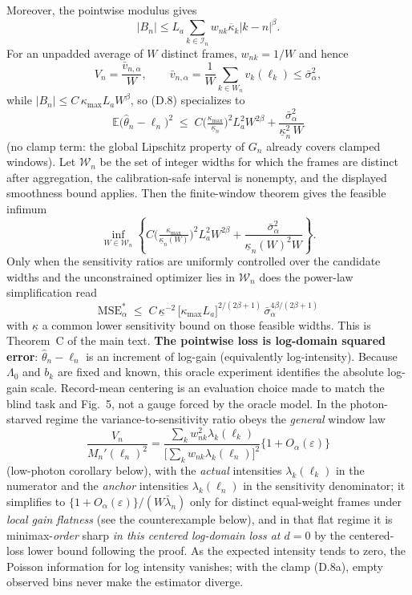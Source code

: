 Moreover, the pointwise modulus gives
\[
|B_n|
\le
L_a\sum_{k\in\mathcal I_n}
w_{nk}\overline\kappa_k|k-n|^\beta.
\]
For an unpadded average of $W$ distinct frames, $w_{nk}=1/W$ and hence
\[
V_n=\frac{\bar v_{n,\alpha}}{W},
\qquad
\bar v_{n,\alpha}
=\frac1W\sum_{k\in W_n}v_k(\ell_k)
\le\bar\sigma_\alpha^2,
\]
while $|B_n|\le C\,\kappa_{\max}L_aW^{\beta}$, so (D.8) specializes to
\[
\mathbb{E}\big(\hat\theta_n-\ell_n\big)^2\;\le\;C\Big(\tfrac{\kappa_{\max}}{\underline\kappa_n}\Big)^{2}L_a^2W^{2\beta}
+\frac{\bar\sigma_\alpha^2}{\underline\kappa_n^2\,W}
\]
(no clamp term: the global Lipschitz property of $G_n$ already covers clamped windows). Let $\mathcal W_n$ be the set of integer widths for which the frames are distinct after aggregation, the calibration-safe interval is nonempty, and the displayed smoothness bound applies. Then the finite-window theorem gives the feasible infimum
\[
\inf_{W\in\mathcal W_n}
\left\{C\Big(\tfrac{\kappa_{\max}}{\underline\kappa_n(W)}\Big)^2L_a^2W^{2\beta}
+\frac{\bar\sigma_\alpha^2}{\underline\kappa_n(W)^2W}\right\}.
\]
Only when the sensitivity ratios are uniformly controlled over the candidate widths and the unconstrained optimizer lies in $\mathcal W_n$ does the power-law simplification read
\begin{equation}
\mathrm{MSE}_\alpha^{*}\;\le\;C\,\underline\kappa^{-2}\,\big[\kappa_{\max}L_a\big]^{2/(2\beta+1)}\,\bar\sigma_\alpha^{4\beta/(2\beta+1)} \tag{D.9}
\end{equation}
with $\underline\kappa$ a common lower sensitivity bound on those feasible widths. This is Theorem~C of the main text. \textbf{The pointwise loss is log-domain squared error}: $\hat\theta_n-\ell_n$ is an increment of log-gain (equivalently log-intensity). Because $\Lambda_0$ and $b_k$ are fixed and known, this oracle experiment identifies the absolute log-gain scale. Record-mean centering is an evaluation choice made to match the blind task and Fig.~5, not a gauge forced by the oracle model. In the photon-starved regime the variance-to-sensitivity ratio obeys the \emph{general} window law
\[
\frac{V_n}{M_n'(\ell_n)^2}
=\frac{\sum_kw_{nk}^2\lambda_k(\ell_k)}{\big[\sum_kw_{nk}\lambda_k(\ell_n)\big]^2}\{1+O_\alpha(\varepsilon)\}
\]
(low-photon corollary below), with the \emph{actual} intensities $\lambda_k(\ell_k)$ in the numerator and the \emph{anchor} intensities $\lambda_k(\ell_n)$ in the sensitivity denominator; it simplifies to $\{1+O_\alpha(\varepsilon)\}/(W\bar\lambda_n)$ only for distinct equal-weight frames under \emph{local gain flatness} (see the counterexample below), and in that flat regime it is minimax-\emph{order} sharp \emph{in this centered log-domain loss at $d=0$} by the centered-loss lower bound following the proof. As the expected intensity tends to zero, the Poisson information for log intensity vanishes; with the clamp (D.8a), empty observed bins never make the estimator diverge.

